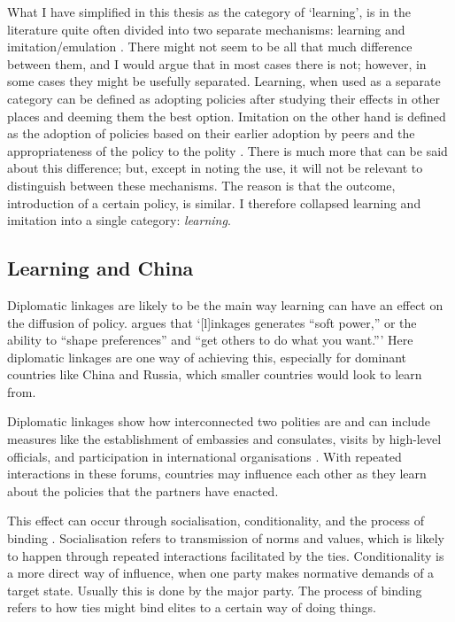 What I have simplified in this thesis as the category of `learning', is in the literature quite often divided into two separate mechanisms: learning and imitation/emulation \citep{ elkins_waves_2005, gilardi_four_2016, shipan_mechanisms_2008}. There might not seem to be all that much difference between them, and I would argue that in most cases there is not; however, in some cases they might be usefully separated. Learning, when used as a separate category can be defined as adopting policies after studying their effects in other places and deeming them the best option. Imitation on the other hand is defined as the adoption of policies based on their earlier adoption by peers and the appropriateness of the policy to the polity \citep[pp. 799-801]{simmons_introduction_2006}. There is much more that can be said about this difference; but, except in noting the use, it will not be relevant to distinguish between these mechanisms. The reason is that the outcome, introduction of a certain policy, is similar. I therefore collapsed learning and imitation into a single category: \textit{learning}. 

\subsection{Learning and China}
Diplomatic linkages are likely to be the main way learning can have an effect on the diffusion of policy. \citet[p. 385]{levitsky_linkage_2006} argues that `[l]inkages generates ``soft power,'' or the ability to ``shape preferences'' and ``get others to do what you want.''' Here diplomatic linkages are one way of achieving this, especially for dominant countries like China and Russia, which smaller countries would look to learn from.

Diplomatic linkages show how interconnected two polities are and can include measures like the establishment of embassies and consulates, visits by high-level officials, and participation in international organisations \citep{ambrosio_catching_2008, economy_exporting_2020, levitsky_linkage_2006, tansey_ties_2017}. With repeated interactions in these forums, countries may influence each other as they learn about the policies that the partners have enacted. 

This effect can occur through socialisation, conditionality, and the process of binding \citep[pp. 1323-1326]{ambrosio_catching_2008}. Socialisation refers to transmission of norms and values, which is likely to happen through repeated interactions facilitated by the ties. Conditionality is a more direct way of influence, when one party makes normative demands of a target state. Usually this is done by the major party. The process of binding refers to how ties might bind elites to a certain way of doing things.

